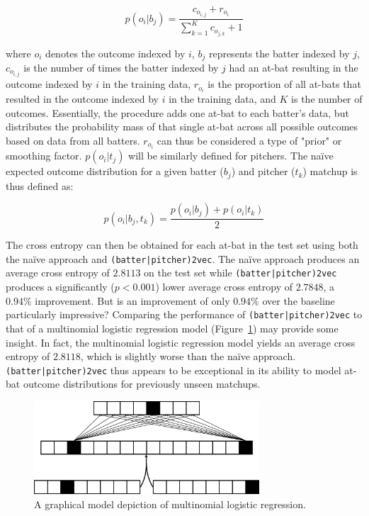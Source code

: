 \documentclass{article}
\begin{document}
\begin{equation}
\label{eqn:batter_naïve}
p(o_i|b_j)=\frac{c_{o_{i,j}} + r_{o_i}}{\sum_{k=1}^{K} c_{o_{j,k}} + 1}
\end{equation}

where $o_i$ denotes the outcome indexed by $i$, $b_j$ represents the batter indexed by $j$, $c_{o_{i,j}}$ is the number of times the batter indexed by $j$ had an at-bat resulting in the outcome indexed by $i$ in the training data, $r_{o_i}$ is the proportion of all at-bats that resulted in the outcome indexed by $i$ in the training data, and $K$ is the number of outcomes. Essentially, the procedure adds one at-bat to each batter's data, but distributes the probability mass of that single at-bat across all possible outcomes based on data from all batters. $r_{o_i}$ can thus be considered a type of "prior" or smoothing factor. $p(o_i|t_j)$ will be similarly defined for pitchers. The naïve expected outcome distribution for a given batter ($b_j$) and pitcher ($t_k$) matchup is thus defined as:

\begin{equation}
\label{eqn:naïve}
p(o_i|b_j,t_k) = \frac{p(o_i|b_j) + p(o_i|t_k)}{2}
\end{equation}

The cross entropy can then be obtained for each at-bat in the test set using both the naïve approach and \texttt{(batter|pitcher)2vec}. The naïve approach produces an average cross entropy of $2.8113$ on the test set while \texttt{(batter|pitcher)2vec} produces a significantly ($p < 0.001$) lower average cross entropy of $2.7848$, a $0.94\%$ improvement. But is an improvement of only $0.94\%$ over the baseline particularly impressive? Comparing the performance of \texttt{(batter|pitcher)2vec} to that of a multinomial logistic regression model (Figure~\ref{fig:log_reg}) may provide some insight. In fact, the multinomial logistic regression model yields an average cross entropy of $2.8118$, which is slightly worse than the naïve approach. \texttt{(batter|pitcher)2vec} thus appears to be exceptional in its ability to model at-bat outcome distributions for previously unseen matchups.

\begin{figure}
\centering
\includegraphics[width=0.75\textwidth,height=\textheight,keepaspectratio]{logistic_regression.png}
\caption{A graphical model depiction of multinomial logistic regression.}
\label{fig:log_reg}
\end{figure}
\end{document}
